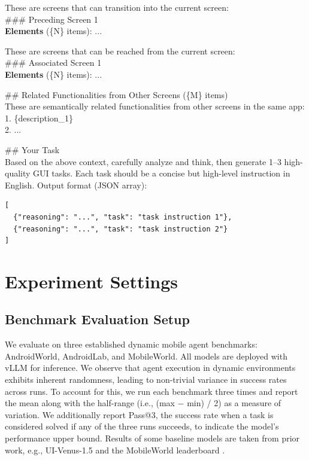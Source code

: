 \documentclass{article} %
\begin{document}
\begin{tcolorbox}[title=Prompt for Task Instruction Synthesis, colback=gray!5, colframe=gray!50, fonttitle=\bfseries\small, fontupper=\small, fontlower=\small, breakable]
These are screens that can transition into the current screen:\\
\#\#\# Preceding Screen 1\\
\textbf{Elements} (\{N\} items): ...

These are screens that can be reached from the current screen:\\
\#\#\# Associated Screen 1\\
\textbf{Elements} (\{N\} items): ...

\#\# Related Functionalities from Other Screens (\{M\} items)\\
These are semantically related functionalities from other screens in the same app:\\
\hspace{1em}1. \{description\_1\}\\
\hspace{1em}2. ...

\#\# Your Task\\
Based on the above context, carefully analyze and think, then generate 1--3 high-quality GUI tasks. Each task should be a concise but high-level instruction in English. Output format (JSON array):
\begin{verbatim}
[
  {"reasoning": "...", "task": "task instruction 1"},
  {"reasoning": "...", "task": "task instruction 2"}
]
\end{verbatim}

\end{tcolorbox}

\section{Experiment Settings}

\subsection{Benchmark Evaluation Setup}
\label{app:benchmark}

We evaluate on three established dynamic mobile agent benchmarks: AndroidWorld, AndroidLab, and MobileWorld.
All models are deployed with vLLM for inference.
We observe that agent execution in dynamic environments exhibits inherent randomness, leading to non-trivial variance in success rates across runs.
To account for this, we run each benchmark three times and report the mean along with the half-range (i.e., (max $-$ min) / 2) as a measure of variation.
We additionally report Pass@3, the success rate when a task is considered solved if any of the three runs succeeds, to indicate the model's performance upper bound.
Results of some baseline models are taken from prior work, e.g., UI-Venus-1.5 \citep{gao2026ui} and the MobileWorld leaderboard \citep{kong2025mobileworld}.
\end{document}

